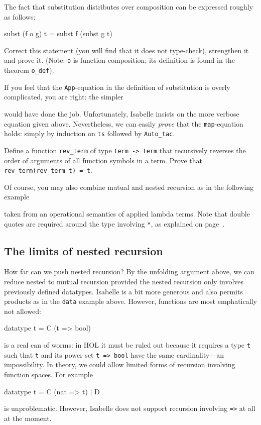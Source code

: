 \begin{exercise}
The fact that substitution distributes over composition can be expressed
roughly as follows:
\begin{ttbox}
subst (f o g) t = subst f (subst g t)
\end{ttbox}
Correct this statement (you will find that it does not type-check),
strengthen it and prove it. (Note: \texttt{o} is function composition; its
definition is found in the theorem \texttt{o_def}).
\end{exercise}

If you feel that the \texttt{App}-equation in the definition of substitution
is overly complicated, you are right: the simpler
\begin{ttbox}
\end{ttbox}
would have done the job. Unfortunately, Isabelle insists on the more verbose
equation given above. Nevertheless, we can easily {\em prove} that the
\texttt{map}-equation holds: simply by induction on \texttt{ts} followed by
\texttt{Auto_tac}.


\begin{exercise}
  Define a function \texttt{rev_term} of type \texttt{term -> term} that
  recursively reverses the order of arguments of all function symbols in a
  term. Prove that \texttt{rev_term(rev_term t) = t}.
\end{exercise}

Of course, you may also combine mutual and nested recursion as in the
following example
\begin{ttbox}
\end{ttbox}
taken from an operational semantics of applied lambda terms. Note that double
quotes are required around the type involving \texttt{*}, as explained on
page~\pageref{startype}.

\subsection{The limits of nested recursion}

How far can we push nested recursion? By the unfolding argument above, we can
reduce nested to mutual recursion provided the nested recursion only involves
previously defined datatypes. Isabelle is a bit more generous and also permits
products as in the \texttt{data} example above.
However, functions are most emphatically not allowed:
\begin{ttbox}
datatype t = C (t => bool)
\end{ttbox}
is a real can of worms: in HOL it must be ruled out because it requires a
type \texttt{t} such that \texttt{t} and its power set \texttt{t => bool}
have the same cardinality---an impossibility.
In theory, we could allow limited forms of recursion involving function
spaces. For example
\begin{ttbox}
datatype t = C (nat => t) | D
\end{ttbox}
is unproblematic. However, Isabelle does not support recursion involving
\texttt{=>} at all at the moment.


